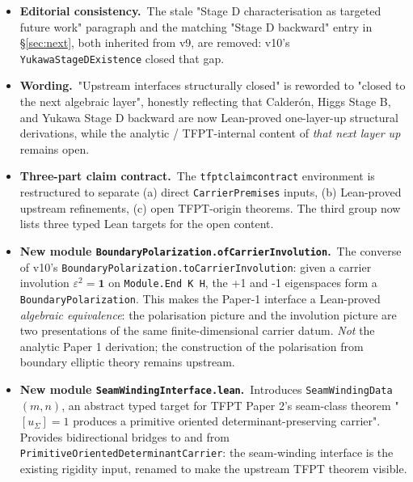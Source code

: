 \documentclass[11pt,a4paper]{article}
\begin{document}
\begin{itemize}[leftmargin=1.6em, itemsep=2pt]
\item \textbf{Editorial consistency.}\ The stale "Stage D
    characterisation as targeted future work" paragraph and the
    matching "Stage D backward" entry in \S\ref{sec:next}, both
    inherited from v9, are removed: v10's
    \texttt{YukawaStageDExistence} closed that gap.

\item \textbf{Wording.}\ "Upstream interfaces structurally
    closed" is reworded to "closed to the next algebraic
    layer", honestly reflecting that Calder\'on, Higgs Stage B,
    and Yukawa Stage D backward are now Lean-proved
    one-layer-up structural derivations, while the analytic
    / TFPT-internal content of \emph{that next layer up}
    remains open.

\item \textbf{Three-part claim contract.}\ The
    \texttt{tfptclaimcontract} environment is restructured to
    separate (a) direct \texttt{CarrierPremises} inputs,
    (b) Lean-proved upstream refinements, (c) open
    TFPT-origin theorems. The third group now lists three
    typed Lean targets for the open content.

\item \textbf{New module
    \texttt{BoundaryPolarization.ofCarrierInvolution}.}\
    The converse of v10's
    \texttt{BoundaryPolarization.toCarrierInvolution}: given
    a carrier involution $\varepsilon^2 = \mathbf 1$ on
    \texttt{Module.End K H}, the +1 and -1 eigenspaces form a
    \texttt{BoundaryPolarization}. This makes the Paper-1
    interface a Lean-proved \emph{algebraic equivalence}: the
    polarisation picture and the involution picture are two
    presentations of the same finite-dimensional carrier
    datum. \emph{Not} the analytic Paper 1 derivation; the
    construction of the polarisation from boundary elliptic
    theory remains upstream.

\item \textbf{New module \texttt{SeamWindingInterface.lean}.}\
    Introduces \texttt{SeamWindingData}\,$(m, n)$, an abstract
    typed target for TFPT Paper 2's seam-class theorem
    "$[u_\Sigma] = 1$ produces a primitive oriented
    determinant-preserving carrier". Provides bidirectional
    bridges to and from \texttt{PrimitiveOrientedDeterminantCarrier}:
    the seam-winding interface is the existing rigidity input,
    renamed to make the upstream TFPT theorem visible.


\end{itemize}
\end{document}
